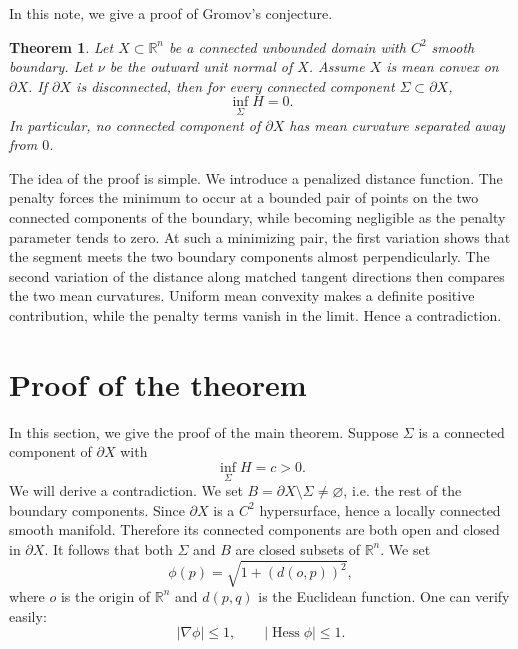 \documentclass[reqno, 11pt]{amsart}
\theoremstyle{plain}
\newtheorem{theorem}{Theorem}[section]
\theoremstyle{definition}
\theoremstyle{remark}
\numberwithin{equation}{section}
\begin{document}
In this note, we give a proof of Gromov's conjecture.
\begin{theorem}\label{thm:Main}
	Let $X\subset \mathbb{R}^n$ be a connected unbounded domain with $C^2$ smooth boundary. Let $\nu$ be the outward unit normal of $X$. Assume $X$ is mean convex on $\partial X$. If $\partial X$ is disconnected, then for every connected component $\Sigma\subset \partial X$,
	\[
		\inf_{\Sigma} H=0.
	\]
	In particular, no connected component of $\partial X$ has mean curvature separated away from $0$.
\end{theorem}


The idea of the proof is simple. We introduce a penalized distance function. The penalty forces the minimum to occur at a bounded pair of points on the two connected components of the boundary, while becoming negligible as the penalty parameter tends to zero. At such a minimizing pair, the first variation shows that the segment meets the two boundary components almost perpendicularly. The second variation of the distance along matched tangent directions then compares the two mean curvatures. Uniform mean convexity makes a definite positive contribution, while the penalty terms vanish in the limit. Hence a contradiction.

\section{Proof of the theorem}
In this section, we give the proof of the main theorem. Suppose $\Sigma$ is a connected component of $\partial X$ with
\begin{equation*}
	\inf_{\Sigma} H =c >0.
\end{equation*}
We will derive a contradiction. We set $B=\partial X\setminus \Sigma \ne \varnothing$, i.e. the rest of the boundary components. Since $\partial X$ is a $C^2$ hypersurface, hence a locally connected smooth manifold. Therefore its connected components are both open and closed in $\partial X$. It follows that both $\Sigma$ and $B$ are closed subsets of $\mathbb{R}^n$. We set
\begin{equation*}
	\phi(p)= \sqrt{1+(d(o, p))^{2}},
\end{equation*}
where $o$ is the origin of $\mathbb{R}^{n}$ and $d(p, q)$ is the Euclidean function. One can verify easily:
\begin{equation}\label{eq:GradHessian}
	|\nabla \phi|\le 1,\qquad |\operatorname{Hess}\phi|\le 1.
\end{equation}
\end{document}
